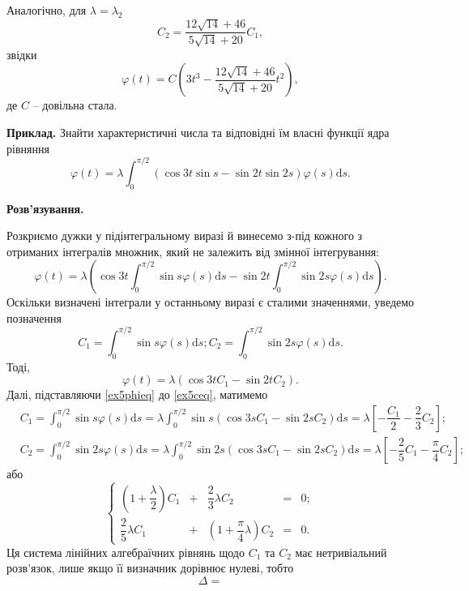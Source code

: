 \documentclass[14pt,twoside]{extreport}
\theoremstyle{mystyle}
\numberwithin{equation}{chapter}
\begin{document}
\begin{small}
Аналогічно, для $\lambda = \lambda_2$
\[
C_2 = \dfrac{12\sqrt{14} + 46}{5\sqrt{14} + 20}C_1,
\]
звідки
\[
\varphi(t) = C \left(3t^3 - \dfrac{12\sqrt{14} + 46}{5\sqrt{14} + 20} t^2\right),
\]
де $C$ -- довільна стала.

\textbf{Приклад.} Знайти характеристичні числа та відповідні їм власні функції ядра рівняння
\[
\varphi(t) = \lambda \int_{0}^{\pi/2} \left(\cos 3t \sin s - \sin 2t \sin 2s\right) \varphi(s) \mathrm{d}s.
\]

\textbf{Розв'язування.}

Розкриємо дужки у підінтегральному виразі й винесемо з-під кожного з отриманих інтегралів множник, який не залежить від змінної інтегрування:
\[
\varphi(t) = \lambda \left(\cos 3t\int_{0}^{\pi/2} \sin s \varphi(s) \mathrm{d}s - \sin 2t \int_{0}^{\pi/2} \sin 2s \varphi(s) \mathrm{d}s\right).
\]
Оскільки визначені інтеграли у останньому виразі є сталими значеннями, уведемо позначення
\begin{equation}\label{ex5ceq}
C_1 = \int_{0}^{\pi/2} \sin s \varphi(s) \mathrm{d}s; C_2 = \int_{0}^{\pi/2} \sin 2s \varphi(s) \mathrm{d}s.
\end{equation}
Тоді,
\begin{equation}\label{ex5phieq}
\varphi(t) = \lambda \left(\cos 3t C_1 - \sin 2t C_2\right).
\end{equation}
Далі, підставляючи \eqref{ex5phieq} до \eqref{ex5ceq}, матимемо
\begin{align*}
&C_1 = \int_{0}^{\pi/2} \sin s \varphi(s) \mathrm{d}s = \lambda \int_{0}^{\pi/2} \sin s \left(\cos 3s C_1 - \sin 2s C_2\right) \mathrm{d}s = \lambda\left[-\dfrac{C_1}{2} - \dfrac{2}{3}C_2\right];\\
&C_2 = \int_{0}^{\pi/2} \sin 2s \varphi(s) \mathrm{d}s = \lambda \int_{0}^{\pi/2} \sin 2s \left(\cos 3s C_1 - \sin 2s C_2\right) \mathrm{d}s = \lambda\left[-\dfrac{2}{5}C_1 - \dfrac{\pi}{4}C_2\right];
\end{align*}
або
\begin{equation}\label{ex5system}
\left\{
\begin{array}{ccccc}
\left(1+\dfrac{\lambda}{2}\right) C_1 &+& \dfrac{2}{3} \lambda C_2 &=& 0;\\
\dfrac{2}{5} \lambda C_1 &+& \left(1+\dfrac{\pi}{4}\lambda\right) C_2 &=& 0.
\end{array}
\right.
\end{equation}
Ця система лінійних алгебраїчних рівнянь щодо $C_1$ та $C_2$ має нетривіальний розв'язок, лише якщо її визначник дорівнює нулеві, тобто
\[
\Delta = 
\]
\end{small}
\end{document}
